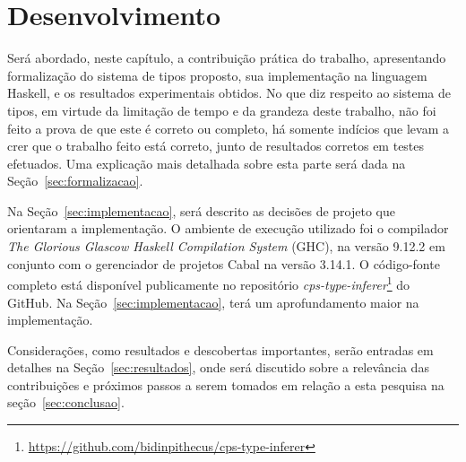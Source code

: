 \chapter{Desenvolvimento}\label{ch:desenvolvimento}

Será abordado, neste capítulo, a contribuição prática do trabalho, apresentando formalização do sistema de tipos proposto, sua implementação na linguagem Haskell, e os resultados experimentais obtidos.
No que diz respeito ao sistema de tipos, em virtude da limitação de tempo e da grandeza deste trabalho, não foi feito a prova de que este é correto ou completo, há somente indícios que levam a crer que o trabalho feito está correto, junto de resultados corretos em testes efetuados.
Uma explicação mais detalhada sobre esta parte será dada na Seção~\ref{sec:formalizacao}.

Na Seção~\ref{sec:implementacao}, será descrito as decisões de projeto que orientaram a implementação. 
O ambiente de execução utilizado foi o compilador \textit{The Glorious Glascow Haskell Compilation System} (GHC), na versão 9.12.2 em conjunto com o gerenciador de projetos Cabal na versão 3.14.1.
O código-fonte completo está disponível publicamente no repositório \textit{cps-type-inferer}\footnote{\url{https://github.com/bidinpithecus/cps-type-inferer}} do GitHub.
Na Seção~\ref{sec:implementacao}, terá um aprofundamento maior na implementação.

Considerações, como resultados e descobertas importantes, serão entradas em detalhes na Seção~\ref{sec:resultados}, onde será discutido sobre a relevância das contribuições e próximos passos a serem tomados em relação a esta pesquisa na seção~\ref{sec:conclusao}.





